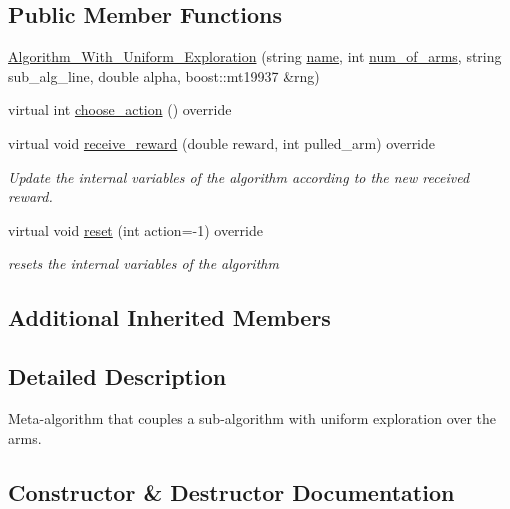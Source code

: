 \subsection*{Public Member Functions}
\begin{DoxyCompactItemize}
\item 
\mbox{\hyperlink{class_algorithm___with___uniform___exploration_accc377b55bd1d48b9cfa1ce952ff3cf8}{Algorithm\+\_\+\+With\+\_\+\+Uniform\+\_\+\+Exploration}} (string \mbox{\hyperlink{class_m_a_b_algorithm_a77b10ecc4b49d519c557f65358167b82}{name}}, int \mbox{\hyperlink{class_m_a_b_algorithm_a340fa9e83e85b092f2c6125fc4e8549b}{num\+\_\+of\+\_\+arms}}, string sub\+\_\+alg\+\_\+line, double alpha, boost\+::mt19937 \&rng)
\item 
virtual int \mbox{\hyperlink{class_algorithm___with___uniform___exploration_a42d5f75def328c83dce00f73dbe26d58}{choose\+\_\+action}} () override
\item 
virtual void \mbox{\hyperlink{class_algorithm___with___uniform___exploration_a946808f681cd7b54bd557e1d8f15c5d0}{receive\+\_\+reward}} (double reward, int pulled\+\_\+arm) override
\begin{DoxyCompactList}\small\item\em Update the internal variables of the algorithm according to the new received reward. \end{DoxyCompactList}\item 
virtual void \mbox{\hyperlink{class_algorithm___with___uniform___exploration_a96b0df2a59099ba8b4cc83f21b407642}{reset}} (int action=-\/1) override
\begin{DoxyCompactList}\small\item\em resets the internal variables of the algorithm \end{DoxyCompactList}\end{DoxyCompactItemize}
\subsection*{Additional Inherited Members}


\subsection{Detailed Description}
Meta-\/algorithm that couples a sub-\/algorithm with uniform exploration over the arms. 

\subsection{Constructor \& Destructor Documentation}
\mbox{\label{class_algorithm___with___uniform___exploration_accc377b55bd1d48b9cfa1ce952ff3cf8}} 
